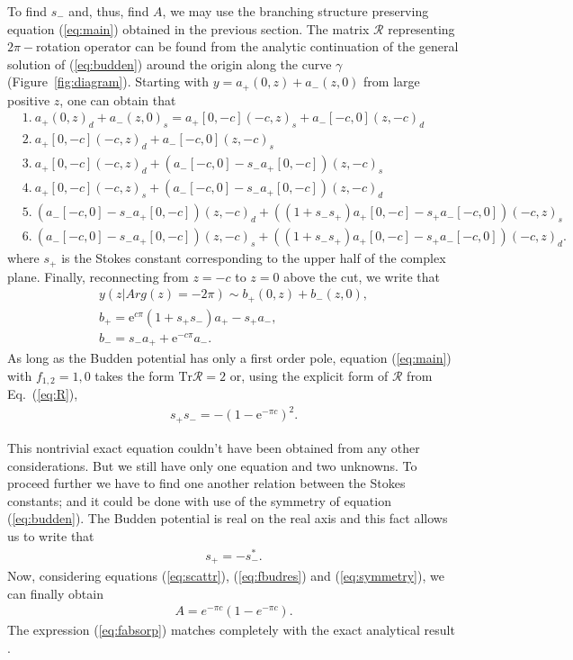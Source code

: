 \documentclass[asy]{iosart2x}
\def\rme{\mathrm{e}}
\def\R{\bm{\mathcal{R}}}
\def\Tr{\mathrm{Tr}}
\newcommand\eref[1]{(\ref{#1})}
\newcommand\fref[1]{Figure~\ref{#1}}
\begin{document}
To find $s_-$ and, thus, find $A$, we may use the branching structure preserving 
equation \eref{eq:main} obtained in the previous section. The matrix $\R$ representing $2\pi-$rotation operator
can be found from the analytic continuation of the general solution of \eref{eq:budden}
around the origin along the curve $\gamma$ (\fref{fig:diagram}). 
Starting with $y=a_+(0,z) + a_-(z,0)$ from large positive $z$, 
one can obtain that
\begin{equation}
\begin{split}
&1.\ a_+(0,z)_d+a_-(z,0)_s=a_+[0,-c](-c,z)_s + a_-[-c,0](z,-c)_d
\\
&2.\ a_+[0,-c](-c,z)_d + a_-[-c,0](z,-c)_s 
\\
&3.\ a_+[0,-c](-c,z)_d + (a_-[-c,0] - s_- a_+[0,-c])(z,-c)_s 
\\
&4.\ a_+[0,-c](-c,z)_s + (a_-[-c,0] - s_- a_+[0,-c])(z,-c)_d 
\\
&5.\ (a_-[-c,0] - s_- a_+[0,-c])(z,-c)_d + ((1 + s_-s_+)a_+[0,-c] - s_+ a_-[-c,0])(-c,z)_s
\\
&6.\ (a_-[-c,0] - s_- a_+[0,-c])(z,-c)_s + ((1 + s_-s_+)a_+[0,-c] - s_+ a_-[-c,0])(-c,z)_d.
\end{split}
\end{equation}
where $s_+$ is the Stokes constant corresponding to the upper half of the complex plane.
Finally, reconnecting from $z=-c$ to $z=0$ above the cut, we write that
\begin{equation}
\begin{split}
y(z | Arg(z) = -2\pi) \sim b_+(0,z) + b_-(z,0),
\\
b_+ = \rme^{c \pi} (1 + s_+s_-)a_+ - s_+a_-,
\\
b_- = s_- a_+ + \rme^{-c \pi} a_-.
\label{eq:R} 
\end{split}
\end{equation}
As long as the Budden potential has only a first order pole, equation \eref{eq:main}
with $f_{1,2}=1,0$ takes the form $\Tr\R=2$ or, using the explicit form of $\R$ from Eq.~\eref{eq:R},
\begin{eqnarray}
s_+s_- = - (1-\rme^{- \pi c})^2.
\label{eq:fbudres}
\end{eqnarray}

This nontrivial exact equation couldn't have been obtained from any other considerations. But we
still have only one equation and two unknowns. To proceed further we have to find one another
relation between the Stokes constants; and it could be done with use of the symmetry 
of equation \eref{eq:budden}. The Budden potential is real on the real axis and
this fact allows us to write \cite{aksymm,frsymm} that
\begin{eqnarray}
s_+ = -s_-^*.
\label{eq:symmetry}
\end{eqnarray}
Now, considering equations \eref{eq:scattr}, \eref{eq:fbudres} and \eref{eq:symmetry}, we can
finally obtain 
\begin{eqnarray}
A = e^{-\pi c}(1-e^{-\pi c}).
\label{eq:fabsorp}
\end{eqnarray}
The expression \eref{eq:fabsorp} matches completely with the exact analytical result \cite{rwbook}.
\end{document}
